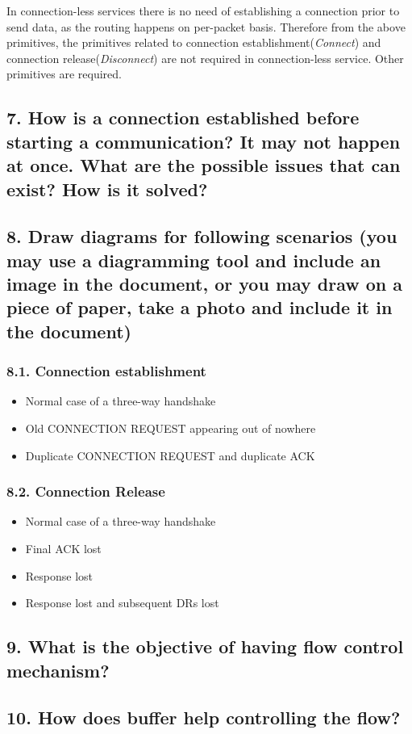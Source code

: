 \documentclass[a4paper,11pt]{article}
\begin{document}
In connection-less services there is no need of establishing a connection prior to send data, as the routing happens on per-packet basis. Therefore from the above primitives, the primitives related to connection establishment({\textit{Connect}}) and connection release({\textit{Disconnect}})  are not required in connection-less service. Other primitives are required.

\subsection*{7. How is a connection established before starting a communication? It may not happen at once. What are the possible issues that can exist? How is it solved?}



\subsection*{8. Draw diagrams for following scenarios (you may use a diagramming tool and include an image in the document, or you may draw on a piece of paper, take a photo and include it in the document)}

\subsubsection*{8.1. Connection establishment}

\begin{itemize}
\item Normal case of a three-way handshake
\item Old CONNECTION REQUEST appearing out of nowhere
\item Duplicate CONNECTION REQUEST  and duplicate ACK
\end{itemize}

\subsubsection*{8.2. Connection Release}

\begin{itemize}
\item Normal case of a three-way handshake
\item Final ACK lost
\item Response lost
\item Response lost and subsequent DRs lost
\end{itemize}

\subsection*{9. What is the objective of having flow control mechanism?}

\subsection*{10. How does buffer help controlling the flow?}
\end{document}
